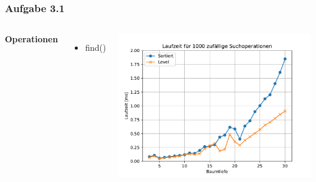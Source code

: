 \documentclass[aspectratio=169]{beamer}
\begin{document}
\begin{frame}
\frametitle{Aufgabe 3.1}
\begin{columns}[c] %
	
	\textbf{Operationen}
	\begin{itemize}
		\item find()
	\end{itemize}
	
	\includegraphics[scale=.6]{Figure_3.pdf}
	
	
\end{columns}
\end{frame}

\end{document}
